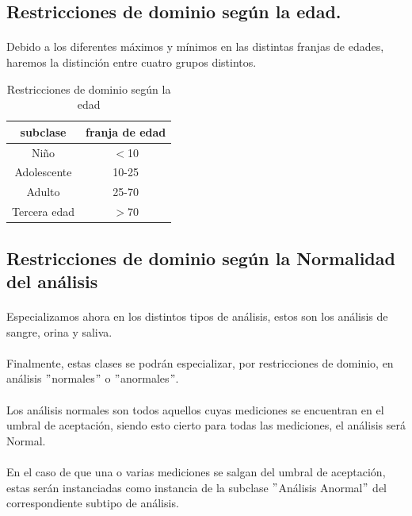 \documentclass[a4paper,10pt]{article}
\begin{document}
\subsection{Restricciones de dominio según la edad.}
\paragraph{}
Debido a los diferentes máximos y mínimos en las distintas franjas de edades, haremos la distinción entre cuatro grupos distintos.
\begin{table}[hbt]
\begin{center}
\begin{tabular}{|c|c|}\hline
subclase & franja de edad \\ \hline
Niño & $<$10 \\ \hline
Adolescente & 10-25 \\ \hline
Adulto & 25-70 \\ \hline
Tercera edad & $>$70 \\ \hline
\end{tabular}
\caption{Restricciones de dominio según la edad}
\end{center}
\end{table}
\pagebreak
\subsection{Restricciones de dominio según la Normalidad del análisis}
\paragraph{}
Especializamos ahora en los distintos tipos de análisis, estos son los análisis de sangre, orina y saliva.
\paragraph{}
Finalmente, estas clases se podrán especializar, por restricciones de dominio, en análisis $"$normales$"$ o $"$anormales$"$.
\paragraph{}
Los análisis normales son todos aquellos cuyas mediciones se encuentran en el umbral de aceptación, siendo esto cierto para todas las mediciones, el análisis será Normal.
\paragraph{}
En el caso de que una o varias mediciones se salgan del umbral de aceptación, estas serán instanciadas como instancia de la subclase $"$Análisis Anormal$"$ del correspondiente subtipo de análisis.
\end{document}
